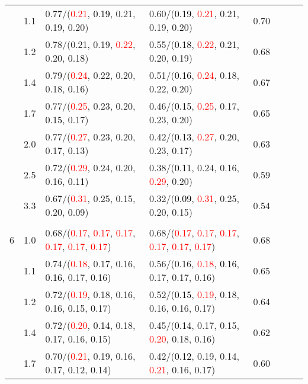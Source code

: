 \documentclass[10pt,a4paper]{report}
\begin{document}
\begin{table}[!htbp]
\begin{center}
{\begin{tabular}{ccllcccc}
			&1.1&0.77/(\textcolor{red}{0.21}, \textcolor{black}{0.19}, 0.21, 0.19, 0.20)&0.60/(\textcolor{black}{0.19}, \textcolor{red}{0.21}, 0.21, 0.19, 0.20)&0.70\\
			&1.2&0.78/(0.21, 0.19, \textcolor{red}{0.22}, 0.20, \textcolor{black}{0.18})&0.55/(\textcolor{black}{0.18}, \textcolor{red}{0.22}, 0.21, 0.20, 0.19)&0.68\\
			&1.4&0.79/(\textcolor{red}{0.24}, 0.22, 0.20, 0.18, \textcolor{black}{0.16})&0.51/(\textcolor{black}{0.16}, \textcolor{red}{0.24}, 0.18, 0.22, 0.20)&0.67\\
			&1.7&0.77/(\textcolor{red}{0.25}, 0.23, 0.20, \textcolor{black}{0.15}, 0.17)&0.46/(\textcolor{black}{0.15}, \textcolor{red}{0.25}, 0.17, 0.23, 0.20)&0.65\\
			&2.0&0.77/(\textcolor{red}{0.27}, 0.23, 0.20, 0.17, \textcolor{black}{0.13})&0.42/(\textcolor{black}{0.13}, \textcolor{red}{0.27}, 0.20, 0.23, 0.17)&0.63\\
			&2.5&0.72/(\textcolor{red}{0.29}, 0.24, 0.20, 0.16, \textcolor{black}{0.11})&0.38/(\textcolor{black}{0.11}, 0.24, 0.16, \textcolor{red}{0.29}, 0.20)&0.59\\
			&3.3&0.67/(\textcolor{red}{0.31}, 0.25, 0.15, 0.20, \textcolor{black}{0.09})&0.32/(\textcolor{black}{0.09}, \textcolor{red}{0.31}, 0.25, 0.20, 0.15)&0.54\\
			&&&&\\
			6			&1.0&0.68/(\textcolor{red}{0.17}, \textcolor{red}{0.17}, \textcolor{red}{0.17}, \textcolor{red}{0.17}, \textcolor{red}{0.17}, \textcolor{red}{0.17})&0.68/(\textcolor{red}{0.17}, \textcolor{red}{0.17}, \textcolor{red}{0.17}, \textcolor{red}{0.17}, \textcolor{red}{0.17}, \textcolor{red}{0.17})&0.68\\
			&1.1&0.74/(\textcolor{red}{0.18}, 0.17, 0.16, \textcolor{black}{0.16}, 0.17, 0.16)&0.56/(0.16, \textcolor{red}{0.18}, \textcolor{black}{0.16}, 0.17, 0.17, 0.16)&0.65\\
			&1.2&0.72/(\textcolor{red}{0.19}, 0.18, 0.16, 0.16, \textcolor{black}{0.15}, 0.17)&0.52/(\textcolor{black}{0.15}, \textcolor{red}{0.19}, 0.18, 0.16, 0.16, 0.17)&0.64\\
			&1.4&0.72/(\textcolor{red}{0.20}, \textcolor{black}{0.14}, 0.18, 0.17, 0.16, 0.15)&0.45/(\textcolor{black}{0.14}, 0.17, 0.15, \textcolor{red}{0.20}, 0.18, 0.16)&0.62\\
			&1.7&0.70/(\textcolor{red}{0.21}, 0.19, 0.16, 0.17, \textcolor{black}{0.12}, 0.14)&0.42/(\textcolor{black}{0.12}, 0.19, 0.14, \textcolor{red}{0.21}, 0.16, 0.17)&0.60\\

\end{tabular}}
\end{center}
\end{table}
\end{document}
